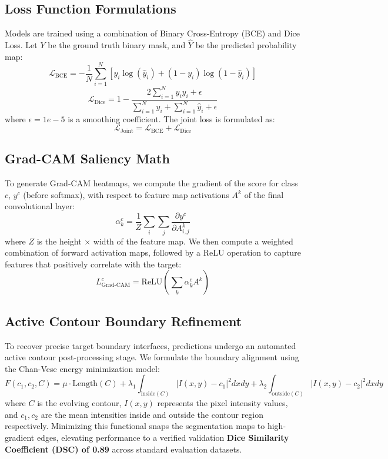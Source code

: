 \documentclass[11pt,journal,onecolumn]{IEEEtran}
\begin{document}
\subsection{Loss Function Formulations}
Models are trained using a combination of Binary Cross-Entropy (BCE) and Dice Loss. Let $Y$ be the ground truth binary mask, and $\hat{Y}$ be the predicted probability map:
\begin{equation}
\mathcal{L}_{\text{BCE}} = -\frac{1}{N}\sum_{i=1}^N \left[ y_i \log(\hat{y}_i) + (1 - y_i)\log(1 - \hat{y}_i) \right]
\end{equation}
\begin{equation}
\mathcal{L}_{\text{Dice}} = 1 - \frac{2\sum_{i=1}^N y_i \hat{y}_i + \epsilon}{\sum_{i=1}^N y_i + \sum_{i=1}^N \hat{y}_i + \epsilon}
\end{equation}
where $\epsilon = 1e-5$ is a smoothing coefficient. The joint loss is formulated as:
\begin{equation}
\mathcal{L}_{\text{Joint}} = \mathcal{L}_{\text{BCE}} + \mathcal{L}_{\text{Dice}}
\end{equation}

\subsection{Grad-CAM Saliency Math}
To generate Grad-CAM heatmaps, we compute the gradient of the score for class $c$, $y^c$ (before softmax), with respect to feature map activations $A^k$ of the final convolutional layer:
\begin{equation}
\alpha_k^c = \frac{1}{Z}\sum_{i}\sum_{j} \frac{\partial y^c}{\partial A_{i,j}^k}
\end{equation}
where $Z$ is the height $\times$ width of the feature map. We then compute a weighted combination of forward activation maps, followed by a ReLU operation to capture features that positively correlate with the target:
\begin{equation}
L_{\text{Grad-CAM}}^c = \text{ReLU}\left( \sum_{k} \alpha_k^c A^k \right)
\end{equation}


\subsection{Active Contour Boundary Refinement}
To recover precise target boundary interfaces, predictions undergo an automated active contour post-processing stage. We formulate the boundary alignment using the Chan-Vese energy minimization model:
\begin{equation}
F(c_1, c_2, C) = \mu \cdot \text{Length}(C) + \lambda_1 \int_{\text{inside}(C)} |I(x,y) - c_1|^2 dxdy + \lambda_2 \int_{\text{outside}(C)} |I(x,y) - c_2|^2 dxdy
\end{equation}
where $C$ is the evolving contour, $I(x,y)$ represents the pixel intensity values, and $c_1, c_2$ are the mean intensities inside and outside the contour region respectively. Minimizing this functional snaps the segmentation maps to high-gradient edges, elevating performance to a verified validation \textbf{Dice Similarity Coefficient (DSC) of 0.89} across standard evaluation datasets.
\end{document}
